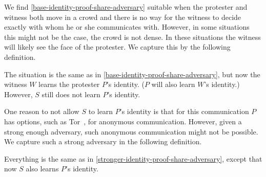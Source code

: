 We find \cref{base-identity-proof-share-adversary} suitable when the protester and witness both move in a crowd and there is no way for the witness to decide exactly with whom he or she communicates with.
However, in some situations this might not be the case, \eg the crowd is not dense.
In these situations the witness will likely see the face of the protester.
We capture this by the following definition.

\begin{definition}%
  \label{stronger-identity-proof-share-adversary}
  The situation is the same as in \cref{base-identity-proof-share-adversary}, but now the 
  witness \(W\) learns the protester \(P\)'s identity.
  (\(P\) will also learn \(W\)'s identity.)
  However, \(S\) still does not learn \(P\)'s identity.
\end{definition}

One reason to not allow \(S\) to learn \(P\)'s identity is that for this communication \(P\) has options, such as Tor~\cite{Tor}, for anonymous communication.
However, given a strong enough adversary, such anonymous communication might not be possible.
We capture such a strong adversary in the following definition.

\begin{definition}%
  \label{strongest-identity-proof-share-adversary}
  Everything is the same as in \cref{stronger-identity-proof-share-adversary}, except that now \(S\) also learns \(P\)'s identity.
\end{definition}

